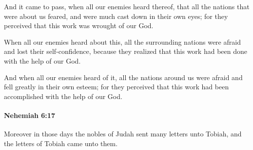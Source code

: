 			\begin{versebox}
					\item[BHS] 
					\item[LXX] 
					\item[ASV] And it came to pass, when all our enemies heard thereof, that all the nations that were about us feared, and were much cast down in their own eyes; for they perceived that this work was wrought of our God.
					\item[NIV] When all our enemies heard about this, all the surrounding nations were afraid and lost their self-confidence, because they realized that this work had been done with the help of our God.
					\item[NRSV] And when all our enemies heard of it, all the nations around us were afraid and fell greatly in their own esteem; for they perceived that this work had been accomplished with the help of our God.
			\end{versebox}

		\paragraph{Nehemiah 6:17} %
			\label{NEHEMIAH-6-17}

			Moreover in those days the nobles of Judah sent many letters unto Tobiah, and the letters of Tobiah came unto them.

